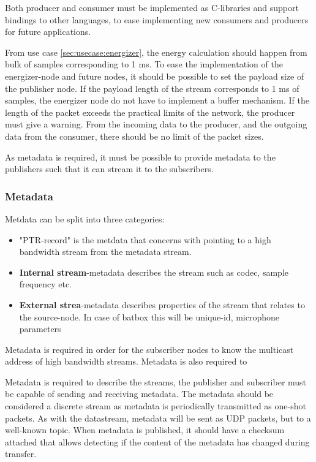 Both producer and consumer must be implemented as C-libraries and support bindings to other languages, to ease implementing new consumers and producers for future applications.

From use case \ref{sec:usecase:energizer}, the energy calculation should happen from bulk of samples corresponding to 1 ms. To ease the implementation of the energizer-node and future nodes, it should be possible to set the payload size of the publisher node. If the payload length of the stream corresponds to 1 ms of samples, the energizer node do not have to implement a buffer mechanism. If the length of the packet exceeds the practical limits of the network, the producer must give a warning. From the incoming data to the producer, and the outgoing data from the consumer, there should be no limit of the packet sizes.

As metadata is required, it must be possible to provide metadata to the publishers such that it can stream it to the subscribers. 

\subsubsection{Metadata}
	
	
Metdata can be split into three categories:
\begin{itemize}
	\item "PTR-record" is the metdata that concerns with pointing to a high bandwidth stream from the metadata stream.
	\item \textbf{Internal stream}-metadata describes the stream such as codec, sample frequency etc.
	\item \textbf{External strea}-metadata describes properties of the stream that relates to the source-node. In case of batbox this will be unique-id, microphone parameters
\end{itemize}
Metadata is required in order for the subscriber nodes to know the multicast address of high bandwidth streams. Metadata is also required to 

Metadata is required to describe the streams, the publisher and subscriber must be capable of sending and receiving metadata. The metadata should be considered a discrete stream as metadata is periodically transmitted as one-shot packets. As with the datastream, metadata will be sent as UDP packets, but to a well-known topic.
When metadata is published, it should have a checksum attached that allows detecting if the content of the metadata has changed during transfer.
 
